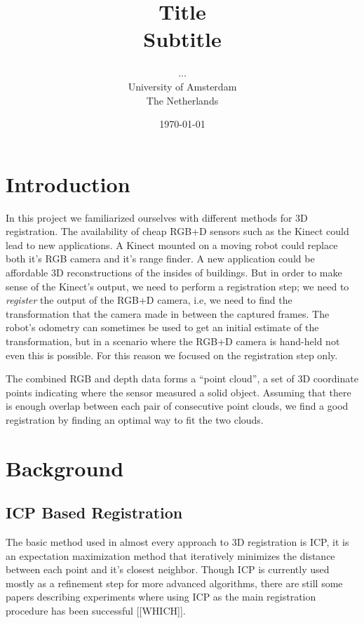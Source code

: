 \documentclass[a4paper]{article}
\title{Title\\
{\large Subtitle}}
\author{...\\
  University of Amsterdam\\
  The Netherlands}
\date{\today}
\begin{document}
\maketitle



\section{Introduction}

In this project we familiarized ourselves with different methods for 3D registration. The availability of cheap RGB+D sensors such as the Kinect could lead to new applications. A Kinect mounted on a moving robot could replace both it's RGB camera and it's range finder. A new application could be affordable 3D reconstructions of the insides of buildings. But in order to make sense of the Kinect's output, we need to perform a registration step; we need to \emph{register} the output of the RGB+D camera, i.e, we need to find the transformation that the camera made in between the captured frames. The robot's odometry can sometimes be used to get an initial estimate of the transformation, but in a scenario where the RGB+D camera is hand-held not even this is possible. For this reason we focused on the registration step only. 

The combined RGB and depth data forms a ``point cloud'', a set of 3D coordinate points indicating where the sensor measured a solid object. Assuming that there is enough overlap between each pair of consecutive point clouds, we find a good registration by finding an optimal way to fit the two clouds.


\section{Background}

\subsection{ICP Based Registration}

The basic method used in almost every approach to 3D registration is \ac{ICP}\cite{besl1992method}, it is an expectation maximization method that iteratively minimizes the distance between each point and it's closest neighbor. Though \ac{ICP} is currently used mostly as a refinement step for more advanced algorithms, there are still some papers describing experiments where using \ac{ICP} as the main registration procedure has been successful [[WHICH]]. 
\end{document}
